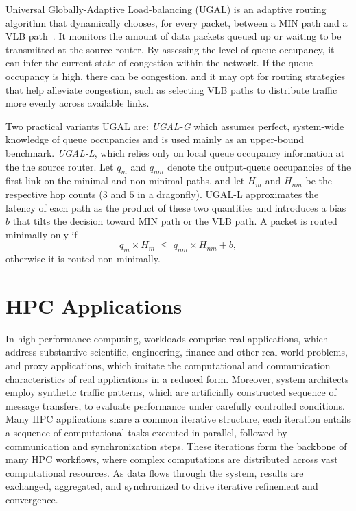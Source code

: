 Universal Globally-Adaptive Load-balancing (UGAL) is an adaptive routing algorithm that dynamically chooses, for every packet,
between a MIN path and a VLB path~\cite{kim2008technology}. It monitors the amount of data packets queued up or waiting to be transmitted at the source router. By assessing the level of queue occupancy, it can infer the current state of congestion within the network. If the queue occupancy is high, there can be congestion, and it may opt for routing strategies that help alleviate congestion, such as selecting VLB paths to distribute traffic more evenly across available links. 

Two practical variants UGAL are:
\emph{UGAL-G} which assumes perfect, system-wide knowledge of queue occupancies and is
used mainly as an upper-bound benchmark.
\emph{UGAL-L}, which relies only on local queue occupancy information at the the source
router.  
Let $q_m$ and $q_{nm}$ denote the output-queue occupancies of the first link on
the minimal and non-minimal paths, and let $H_m$ and $H_{nm}$ be the respective
hop counts ($3$ and $5$ in a dragonfly).  
UGAL-L approximates the latency of each path as the product of these two
quantities and introduces a bias~$b$ that tilts the decision toward MIN path or
the VLB path.  
A packet is routed minimally only if
\[
  q_m \times H_m \;\le\; q_{nm} \times H_{nm} + b,
\]
otherwise it is routed non-minimally.  



\section{HPC Applications}
\label{sec:exp}
In high-performance computing, workloads comprise real applications, which address substantive scientific, engineering, finance and other real-world problems, and proxy applications, which imitate the computational and communication characteristics of real applications in a reduced form. Moreover, system architects employ synthetic traffic patterns, which are artificially constructed sequence of message transfers, to evaluate performance under carefully controlled conditions.
Many HPC applications share a common iterative structure, each iteration entails a sequence of computational tasks executed in parallel, followed by communication and synchronization steps. These iterations form the backbone of many HPC workflows, where complex computations are distributed across vast computational resources. As data flows through the system, results are exchanged, aggregated, and synchronized to drive iterative refinement and convergence.

